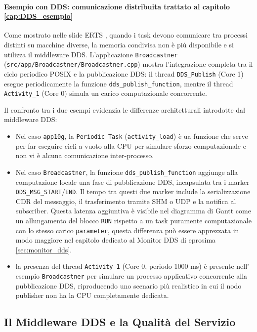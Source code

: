 \paragraph{Esempio con DDS: comunicazione distribuita trattato al capitolo \ref{cap:DDS_esempio}}
Come mostrato nelle slide ERTS \cite{brugali_erts_posix}, quando i task devono comunicare tra processi distinti su macchine diverse, la memoria condivisa non è più disponibile e si utilizza il middleware DDS. L'applicazione \texttt{Broadcastner} (\texttt{src/app/Broadcastner/Broadcastner.cpp}) mostra l'integrazione completa tra il ciclo periodico POSIX e la pubblicazione DDS: il thread \texttt{DDS\_Publish} (Core 1) esegue periodicamente la funzione \texttt{dds\_publish\_function}, mentre il thread \texttt{Activity\_1} (Core 0) simula un carico computazionale concorrente.


Il confronto tra i due esempi evidenzia le differenze architetturali introdotte dal middleware DDS:
\begin{itemize}
	\item Nel caso \texttt{app10g}, la \texttt{Periodic Task} (\texttt{activity\_load}) è ua funzione che serve per far eseguire cicli a vuoto alla CPU per simulare sforzo computazionale e  non vi è alcuna comunicazione inter-processo.
	\item Nel caso \texttt{Broadcastner}, la funzione \texttt{dds\_publish\_function} aggiunge alla computazione locale una fase di pubblicazione DDS, incapsulata tra i marker \texttt{DDS\_MSG\_START}/\texttt{END}. Il tempo tra questi due marker include la serializzazione CDR del messaggio, il trasferimento tramite SHM  o UDP e la notifica al subscriber. Questa latenza aggiuntiva è visibile nel diagramma di Gantt come un allungamento del blocco \texttt{RUN} rispetto a un task puramente computazionale con lo stesso carico \texttt{parameter}, questa differenza può essere apprezzata in modo maggiore nel capitolo dedicato al Monitor DDS di eprosima \ref{sec:monitor_dds}.
	\item la presenza del thread \texttt{Activity\_1} (Core 0, periodo 1000 ms) è presente nell' esempio \texttt{Broadcastner} per simulare un processo applicativo concorrente alla pubblicazione DDS, riproducendo uno scenario più realistico in cui il nodo publisher non ha la CPU completamente dedicata.
\end{itemize}

\clearpage
\subsection{Il Middleware DDS e la Qualità del Servizio}

